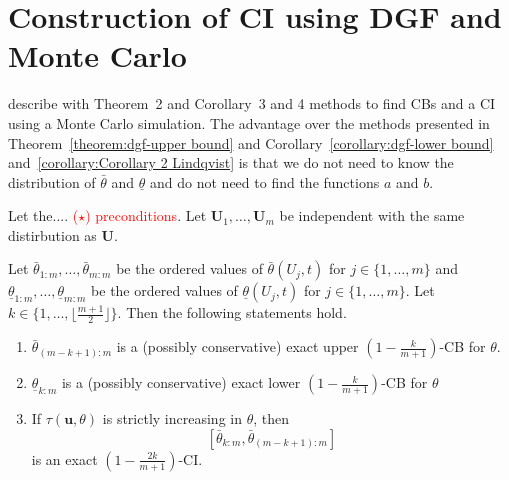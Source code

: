 \section{Construction of CI using DGF and Monte Carlo}

\cite{Lindqvist2025simulated} describe with Theorem~2 and Corollary~3 and 4 methods to find CBs and a CI using a Monte Carlo simulation. The advantage over the methods presented in Theorem~\ref{theorem:dgf-upper bound} and Corollary~\ref{corollary:dgf-lower bound} and~\ref{corollary:Corollary 2 Lindqvist} is that we do not need to know the distribution of $\bar \theta$ and $\underline \theta$ and do not need to find the functions $a$ and $b$.



\begin{theorem}
	Let the.... \textcolor{red}{($\star$) preconditions}.
	Let $\mathbf U_1, \ldots , \mathbf U_m$ be independent with the same distirbution as $\mathbf U$. 
	
	Let $\bar \theta_{1:m}, \ldots , \bar \theta_{m:m}$ be the ordered values of $\bar \theta(U_j, t)$ for $j \in \{1, \ldots , m\}$ and 
	$\underline \theta_{1:m}, \ldots , \underline \theta_{m:m}$ be the ordered values of $\underline \theta(U_j, t)$ for $j \in \{1, \ldots , m\}$.
	Let $k \in \{1 , \ldots , \lfloor \frac{m+1}{2} \rfloor\}$.
	Then the following statements hold.
	\begin{enumerate}[label=(\alph*)]
		\item \label{theorem_monte_carlo_a}
		$\bar \theta_{(m-k+1):m}$ is a (possibly conservative) exact upper $\left(1 - \frac{k}{m+1} \right)$-CB for $\theta$.
		\item \label{theorem_monte_carlo_b}
		$\underline \theta_{k:m}$ is a (possibly conservative) exact lower $\left(1 - \frac{k}{m+1} \right)$-CB for $\theta$
		\item \label{theorem_monte_carlo_c}
		If $\tau(\mathbf u, \theta)$ is strictly increasing in $\theta$, then 
		\[
			\left[ \bar \theta_{k:m}, \bar \theta_{(m-k+1):m} \right]
		\]
		is an exact $\left( 1 - \frac{2k}{m+1} \right)$-CI.
	\end{enumerate}
\end{theorem}


